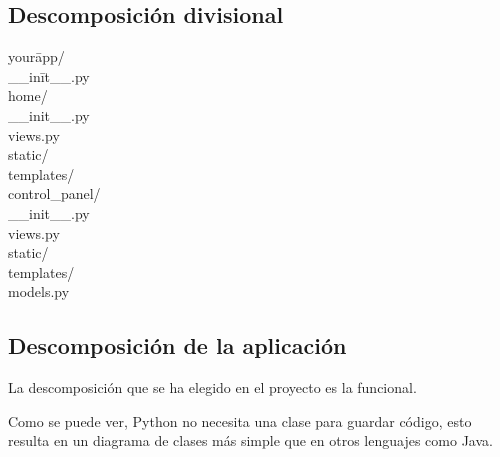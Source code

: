 \subsection{Descomposición divisional}

\begin{tabbing}
your\= app/ \\
\> \_\_in\= it\_\_.py \\
\> home/ \\
\> \> \_\_init\_\_.py \\
\> \> views.py \\
\> \> static/ \\
\> \> templates/ \\
\> control\_panel/ \\
\> \> \_\_init\_\_.py \\
\> \> views.py \\
\> \> static/ \\
\> \> templates/ \\
\> models.py \\
\end{tabbing}

\subsection{Descomposición de la aplicación}
La descomposición que se ha elegido en el proyecto es la funcional. 

Como se puede ver, Python no necesita una clase para guardar código, esto resulta en un diagrama de clases más simple que en otros lenguajes como Java.


